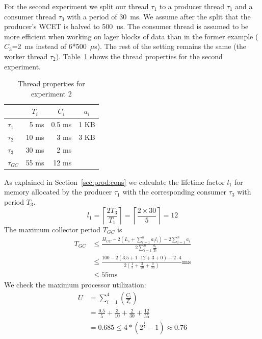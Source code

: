 For the second experiment we split our thread $\tau_1$ to a producer
thread $\tau_1$ and a consumer thread $\tau_3$ with a period of
30~ms. We assume after the split that the producer's WCET is halved
to 500~us. The consumer thread is assumed to be more efficient when
working on lager blocks of data than in the former example
($C_3$=2~ms instead of 6*500~$\mu$s). The rest of the setting
remains the same (the worker thread $\tau_2$). Table~\ref{fig:ex2}
shows the thread properties for the second experiment.

\begin{table}[tb]
\begin{center}
\begin{tabular}{lrrr}
    \toprule
    & \multicolumn{1}{c}{$T_i$} & \multicolumn{1}{c}{$C_i$} &\multicolumn{1}{c}{$a_i$} \\
    \midrule
    $\tau_1$ & 5 ms & 0.5 ms & 1 KB \\
    $\tau_2$ & 10 ms & 3 ms & 3 KB \\
    $\tau_3$ & 30 ms & 2 ms & \\
    $\tau_{GC}$ & 55 ms & 12 ms & \\
    \bottomrule
\end{tabular}
    \caption{Thread properties for experiment 2}
\label{fig:ex2}
\end{center}
\end{table}

As explained in Section~\ref{sec:prod:cons} we calculate the
lifetime factor $l_1$ for memory allocated by the producer $\tau_1$
with the corresponding consumer $\tau_3$ with period $T_3$.
\begin{equation*}
    l_1 = \left\lceil\frac{2 T_3}{T_1}\right\rceil
        = \left\lceil\frac{2 \times 30}{5}\right\rceil
        = 12
\end{equation*}
%
The maximum collector period $T_{GC}$ is
\begin{align*}
    T_{GC} & \le \frac{H_{CC}-2\left(L_s+\sum_{i=1}^{n} a_i l_i\right)-2\sum_{i=1}^{n} a_i}
        {2\sum_{i=1}^{n} \frac{a_i}{Ti}} \\
           & \le \frac{100-2(3.5+1\cdot12+3+0)-2\cdot4}
           {2\left(\frac{1}{5}+\frac{3}{10}+\frac{0}{30}\right)}\mbox{ms}\\
           & \le 55\mbox{ms}
\end{align*}
We check the maximum processor utilization:
\begin{align*}
    U & = \sum_{i=1}^{4}\left(\frac{C_i}{T_i}\right)\\
      & = \frac{0.5}{5} + \frac{3}{10} + \frac{2}{30} + \frac{12}{55}\\
      & = 0.685 \le 4*(2^{\frac{1}{4}}-1) \approx 0.76
\end{align*}

